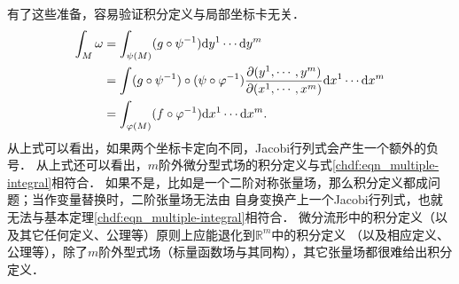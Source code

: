 有了这些准备，容易验证积分定义与局部坐标卡无关．
\begin{align*}
    \int_{M} \omega & = \int_{\psi(M)} (g\circ\psi^{-1}) {\rm d}y^1 \cdots {\rm d}y^m \\
    &=\int (g\circ\psi^{-1})\circ(\psi \circ \varphi^{-1})
    \frac  {\partial (y^1,\cdots, y^m)} {\partial (x^1, \cdots, x^m)}
    {\rm d}x^1 \cdots {\rm d}x^m  \\
    &=   \int_{\varphi(M)} (f\circ\varphi^{-1}) {\rm d}x^1 \cdots {\rm d}x^m .
\end{align*}
从上式可以看出，如果两个坐标卡定向不同，Jacobi行列式会产生一个额外的负号．
从上式还可以看出，$m$阶外微分型式场的积分定义与式\eqref{chdf:eqn_multiple-integral}相符合．
如果不是，比如是一个二阶对称张量场，那么积分定义都成问题；当作变量替换时，二阶张量场无法由
自身变换产上一个Jacobi行列式，也就无法与基本定理\eqref{chdf:eqn_multiple-integral}相符合．
微分流形中的积分定义（以及其它任何定义、公理等）原则上应能退化到$\mathbb{R}^m$中的积分定义
（以及相应定义、公理等），除了$m$阶外型式场（标量函数场与其同构），其它张量场都很难给出积分定义．


